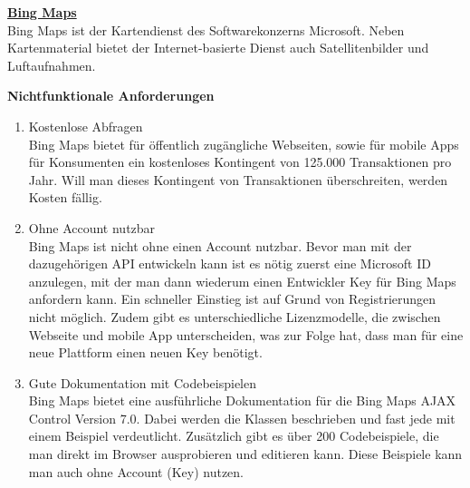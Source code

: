 \textbf{\underline{Bing Maps}}\\
Bing Maps ist der Kartendienst des Softwarekonzerns Microsoft. Neben Kartenmaterial bietet der Internet-basierte Dienst auch Satellitenbilder und Luftaufnahmen.

\textbf{Nichtfunktionale Anforderungen}
\begin{enumerate}
\item Kostenlose Abfragen \\
Bing Maps bietet für öffentlich zugängliche Webseiten, sowie für mobile Apps für Konsumenten ein kostenloses Kontingent von 125.000 Transaktionen pro Jahr. Will man dieses Kontingent von Transaktionen überschreiten, werden Kosten fällig.
\cite{microsoft}

\item Ohne Account nutzbar\\
Bing Maps ist nicht ohne einen Account nutzbar. Bevor man mit der dazugehörigen API entwickeln kann ist es nötig zuerst eine Microsoft ID anzulegen, mit der man dann wiederum einen Entwickler Key für Bing Maps anfordern kann. Ein schneller Einstieg ist auf Grund von Registrierungen nicht möglich. Zudem gibt es unterschiedliche Lizenzmodelle, die zwischen Webseite und mobile App unterscheiden, was zur Folge hat, dass man für eine neue Plattform einen neuen Key benötigt. \cite{gruber2015} \cite{microsoft}

\item Gute Dokumentation mit Codebeispielen\\
Bing Maps bietet eine ausführliche Dokumentation für die Bing Maps AJAX Control Version 7.0. Dabei werden die Klassen beschrieben und fast jede mit einem Beispiel verdeutlicht. 
Zusätzlich gibt es über 200 Codebeispiele, die man direkt im Browser ausprobieren und editieren kann. Diese Beispiele kann man auch ohne Account (Key) nutzen.

\end{enumerate}



